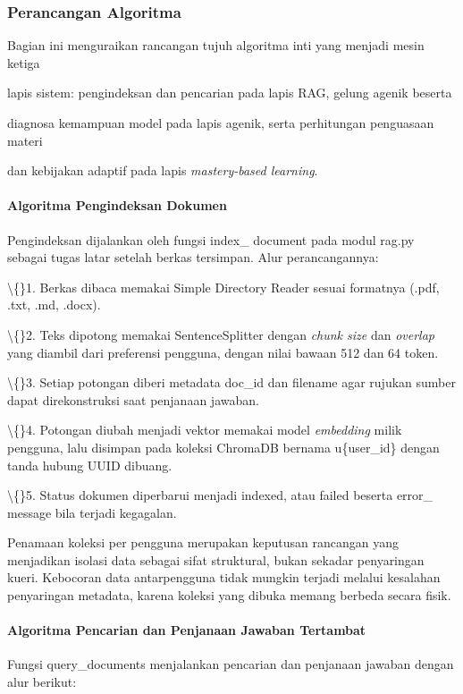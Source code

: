 \documentclass[12pt,a4paper]{article}
\begin{document}
\subsubsection*{Perancangan Algoritma}
Bagian ini menguraikan rancangan tujuh algoritma inti yang menjadi mesin ketiga

lapis sistem: pengindeksan dan pencarian pada lapis RAG, gelung agenik beserta

diagnosa kemampuan model pada lapis agenik, serta perhitungan penguasaan materi

dan kebijakan adaptif pada lapis \textit{mastery-based learning}.

\paragraph*{Algoritma Pengindeksan Dokumen}
Pengindeksan dijalankan oleh fungsi index\_ document pada modul rag.py sebagai tugas latar setelah berkas tersimpan. Alur perancangannya:

\textbackslash\{\}1. Berkas dibaca memakai Simple Directory Reader sesuai formatnya (.pdf, .txt, .md, .docx).

\textbackslash\{\}2. Teks dipotong memakai SentenceSplitter dengan \textit{chunk size} dan \textit{overlap} yang diambil dari preferensi pengguna, dengan nilai bawaan 512 dan 64 token.

\textbackslash\{\}3. Setiap potongan diberi metadata doc\_id dan filename agar rujukan sumber dapat direkonstruksi saat penjanaan jawaban.

\textbackslash\{\}4. Potongan diubah menjadi vektor memakai model \textit{embedding} milik pengguna, lalu disimpan pada koleksi ChromaDB bernama u\{user\_id\} dengan tanda hubung UUID dibuang.

\textbackslash\{\}5. Status dokumen diperbarui menjadi indexed, atau failed beserta error\_ message bila terjadi kegagalan.

Penamaan koleksi per pengguna merupakan keputusan rancangan yang menjadikan isolasi data sebagai sifat struktural, bukan sekadar penyaringan kueri. Kebocoran data antarpengguna tidak mungkin terjadi melalui kesalahan penyaringan metadata, karena koleksi yang dibuka memang berbeda secara fisik.

\paragraph*{Algoritma Pencarian dan Penjanaan Jawaban Tertambat}
Fungsi query\_documents menjalankan pencarian dan penjanaan jawaban dengan alur berikut:
\end{document}
